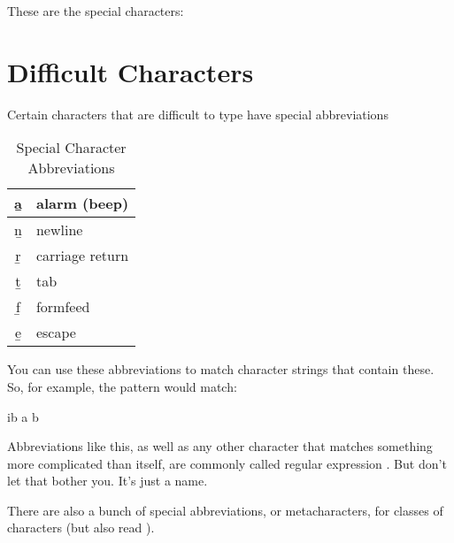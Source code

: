 \documentclass{dods-book}
\begin{document}
These are the special characters:



\section{Difficult Characters}
\label{difficult}

Certain characters that are difficult to type have special
abbreviations

\begin{table}[h]
  \begin{center}
    \begin{tabular}[c]{|c|l|} \hline
      \b{a} & alarm (beep) \\ \hline
      \b{n} & newline \\ \hline
      \b{r} & carriage return \\ \hline
      \b{t} & tab \\ \hline
      \b{f} & formfeed \\ \hline
      \b{e} & escape \\ \hline
    \end{tabular}
    \caption{Special Character Abbreviations}
    \label{tab:special}
  \end{center}
\end{table}

You can use these abbreviations to match character strings that
contain these.  So, for example, the pattern  would
match:

\begin{vcode}{ib}
a
b
\end{vcode}

Abbreviations like this, as well as any other character that matches
something more complicated than itself, are commonly called regular
expression .  But don't let that bother you.  It's
just a name.

There are also a bunch of special abbreviations, or metacharacters,
for classes of characters (but also read ).
\end{document}
